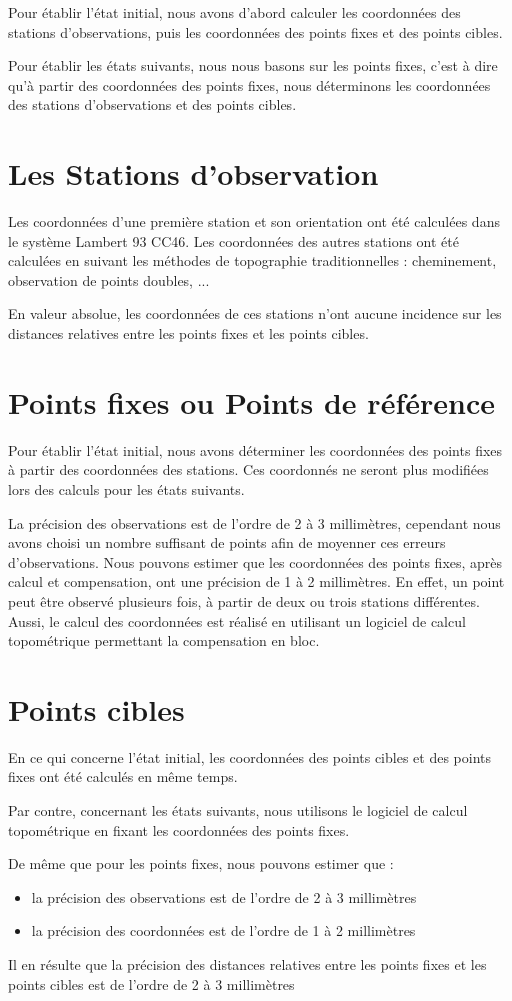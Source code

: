 
Pour établir l'état initial, nous avons d'abord calculer les coordonnées des stations d'observations, puis les coordonnées des points fixes et des points cibles.

Pour établir les états suivants, nous nous basons sur les points fixes, c'est à dire qu'à partir des coordonnées des points fixes, nous déterminons les coordonnées des stations d'observations et des points cibles.

\section{Les Stations d'observation}

Les coordonnées d'une première station et son orientation ont été calculées dans le système Lambert 93 CC46.
Les coordonnées des autres stations ont été calculées en suivant les méthodes de topographie traditionnelles : cheminement, observation de points doubles, ...

En valeur absolue, les coordonnées de ces stations n'ont aucune incidence sur les distances relatives entre les points fixes et les points cibles.  

\section{Points fixes ou Points de référence}
Pour établir l'état initial, nous avons déterminer les coordonnées des points fixes à partir des coordonnées des stations.
Ces coordonnés ne seront plus modifiées lors des calculs pour les états suivants.

La précision des observations est de l'ordre de 2 à 3 millimètres, cependant nous avons choisi un nombre suffisant de points afin de moyenner ces erreurs d'observations.
Nous pouvons estimer que les coordonnées des points fixes, après calcul et compensation, ont une précision de 1 à 2 millimètres.
En effet, un point peut être observé plusieurs fois, à partir de deux ou trois stations différentes.
Aussi, le calcul des coordonnées est réalisé en utilisant un logiciel de calcul topométrique permettant la compensation en bloc.

\section{Points cibles}
En ce qui concerne l'état initial, les coordonnées des points cibles et des points fixes ont été calculés en même temps.

Par contre, concernant les états suivants, nous utilisons le logiciel de calcul topométrique en fixant les coordonnées des points fixes.

De même que pour les points fixes, nous pouvons estimer que :
\begin{itemize}
    \item la précision des observations est de l'ordre de 2 à 3 millimètres
    \item la précision des coordonnées est de l'ordre de 1 à 2 millimètres
\end{itemize}
Il en résulte que la précision des distances relatives entre les points fixes et les points cibles est de l'ordre de 2 à 3 millimètres
